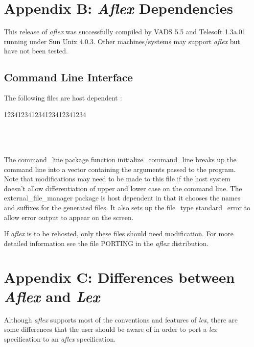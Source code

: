 \newpage
\section{Appendix B: {\sl Aflex} Dependencies}

This release of {\sl aflex} was successfully compiled by VADS 5.5 and
Telesoft 1.3a.01 running under Sun Unix 4.0.3.  Other 
machines/systems may support {\sl aflex} but have not been tested.

\subsection{Command Line Interface}
The following files are host dependent : 
\begin{tabbing}
1234\=1234\=1234\=1234\=1234\=1234 \kill
    \>    \\
    \>    \\
    \>    \\
    \>    \\
\end{tabbing}
The command\_line package function {\sc initialize\_command\_line}
breaks up the command line into a vector containing
the arguments passed to the program.  Note that modifications may need
to be made to this file if the host system doesn't allow differentiation
of upper and lower case on the command line.
\mysk
The external\_file\_manager package is host dependent in that it chooses
the names and suffixes for the generated files.  It also sets up the
file\_type {\sc standard\_error} to allow error output to appear on the
screen.

\mysk
If {\sl aflex} is to be rehosted, only these files should need modification.
For more detailed information see the file PORTING in the {\sl aflex}
distribution.
\newpage
\section{Appendix C: Differences between {\sl Aflex} and {\sl Lex}}
\label{lexdiff}

Although {\sl aflex} supports most of the
conventions and features of {\sl lex}, there are some differences
that the user should be aware of in order to port a {\sl lex} specification
to an {\sl aflex} specification.

